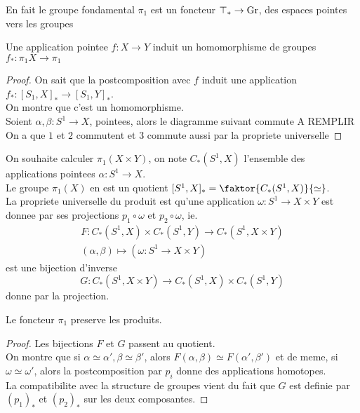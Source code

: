\documentclass[../main.tex]{subfiles}
\begin{document}
En fait le groupe fondamental $\pi_1$ est un foncteur $\top_\ast \to \operatorname{Gr}$, des espaces pointes vers les groupes 
\begin{propo}
Une application pointee $f:X\to Y$ induit un homomorphisme de groupes $f_\ast:\pi_1 X\to \pi_1$ 
\end{propo}
\begin{proof}
On sait que la postcomposition avec $f$ induit une application $f_\ast: [ S_1, X]_\ast \to [ S_1, Y]_\ast $.\\
On montre que c'est un homomorphisme.\\
Soient $\alpha,\beta: S^{1}\to X$, pointees, alors le diagramme suivant commute
A REMPLIR\\

On a que $1$ et $2$ commutent et 3 commute aussi par la propriete universelle 
\end{proof}
On souhaite calculer $\pi_1( X\times Y) $, on note $C_\ast ( S^{1},X) $ l'ensemble des applications pointees $\alpha: S^{1}\to X$.\\
Le groupe $\pi_1 ( X) $ en est un quotient $ [ S^{1},X]_\ast =\faktor { C_\ast ( S^{1}, X)  } { \simeq} $.\\
La propriete universelle du produit est qu'une application $\omega: S^{1}\to X\times Y$ est donnee par ses projections $p_1\circ \omega$ et $p_2\circ \omega$, ie.
\begin{align*}
F: C_\ast ( S^{1}, X) \times C_\ast ( S^{1},Y) \to C_\ast ( S^{1},X\times Y) \\
( \alpha,\beta) \mapsto(  \omega: S^{1}\to X\times Y)
\end{align*}
est une bijection d'inverse 
\[ 
G: C_\ast( S^{1},X\times Y) \to C_\ast ( S^{1}, X) \times C_\ast ( S^{1},Y) 
\]
donne par la projection.
\begin{propo}
	Le foncteur $\pi_1$ preserve les produits.
\end{propo}
\begin{proof}
Les bijections $F$ et $G$ passent au quotient.\\
On montre que si $\alpha\simeq \alpha', \beta\simeq \beta'$, alors $F( \alpha,\beta) \simeq F( \alpha',\beta') $ et de meme, si $\omega\simeq \omega'$, alors la postcomposition par $p_i$ donne des applications homotopes.\\
La compatibilite avec la structure de groupes vient du fait que $G$ est definie par $( p_1) _\ast$ et $( p_2 )_\ast$ sur les deux composantes.
\end{proof}
\end{document}
